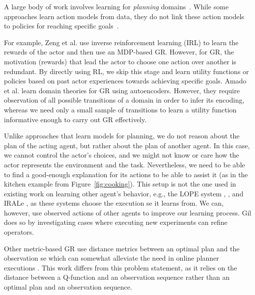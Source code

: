 \documentclass[letterpaper]{article}
\begin{document}
A large body of work involves learning for \textit{planning} domains~\cite{zimmerman2003learning,arora2018review}.
While some approaches learn action models from data, they do not link these action models to policies for reaching specific goals~\cite{amir2008learning,amado2019latrec,asai2020learning,juba2021safe}.

For example, Zeng et al.  use inverse reinforcement learning (IRL) to learn the rewards of the actor and then use an MDP-based GR.
However, for GR, the motivation (rewards) that lead the actor to choose one action over another is redundant.
By directly using RL, we skip this stage and learn utility functions or policies based on past actor experiences towards achieving specific goals.
Amado et al.  learn domain theories for GR using autoencoders.
However, they require observation of all possible transitions of a domain in order to infer its encoding, whereas we need only a small sample of transitions to learn a utility function informative enough to carry out GR effectively.

Unlike approaches that learn models for planning, we do not reason about the plan of the acting agent, but rather about the plan of another agent.
In this case, we cannot control the actor's choices, and we might not know or care how the actor represents the environment and the task.
Nevertheless, we need to be able to find a good-enough explanation for its actions to be able to assist it (as in the kitchen example from Figure~\ref{fig:cooking}).
This setup is not the one used in existing work on learning other agent's behavior, e.g., the LOPE system \cite{garcia2000integrated}, \cite{safaei2007incremental}, and IRALe \cite{rodrigues2011active}, as these systems choose the execution se it learns from.
We can, however, use observed actions of other agents to improve our learning process.
Gil  does so by investigating cases where executing new experiments can refine operators.

Other metric-based GR use distance metrics between an optimal plan and the observation se which can somewhat alleviate the need in online planner executions \cite{masters2017cost,mirsky2019new}. This work differs from this problem statement, as it relies on the distance between a Q-function and an observation sequence rather than an optimal plan and an observation sequence.
%
\end{document}

